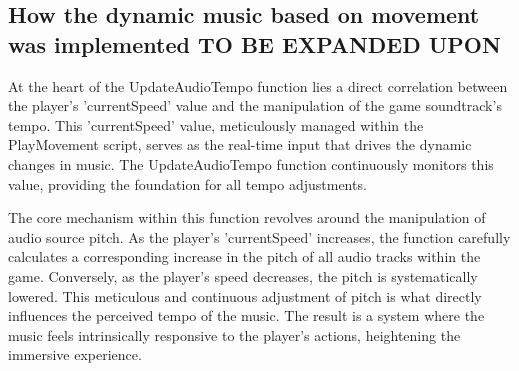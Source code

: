 \documentclass{l4proj}
\begin{document}
\subsection{How the dynamic music based on movement was implemented \textbf{TO BE EXPANDED UPON}} 
At the heart of the UpdateAudioTempo function lies a direct correlation between the player's 'currentSpeed' value and the manipulation of the game soundtrack's tempo.  This 'currentSpeed' value, meticulously managed within the PlayMovement script, serves as the real-time input that drives the dynamic changes in music.  The UpdateAudioTempo function continuously monitors this value, providing the foundation for all tempo adjustments.

The core mechanism within this function revolves around the manipulation of audio source pitch.  As the player's 'currentSpeed' increases, the function carefully calculates a corresponding increase in the pitch of all audio tracks within the game.  Conversely, as the player's speed decreases, the pitch is systematically lowered.  This meticulous and continuous adjustment of pitch is what directly influences the perceived tempo of the music. The result is a system where the music feels intrinsically responsive to the player's actions, heightening the immersive experience.








\end{document}
